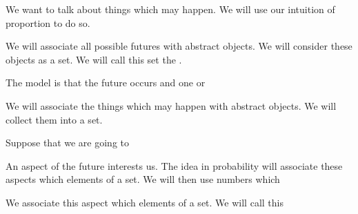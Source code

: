 
\sbasic


\sstart
{}


We want to talk about
things which may happen.
We will use our intuition
of proportion to do so.


We will associate all possible
futures with abstract objects.
We will consider these
objects as a set.
We will call this set
the .

The model is that the future
occurs and one or

We will associate the
things which may happen
with abstract objects.
We will collect them
into a set.

Suppose that we are going to

An aspect of the future
interests us. The idea
in probability will associate
these aspects which elements
of a set.
We will then use numbers which

We associate
this aspect which elements
of a set.
We will call this
\strats
